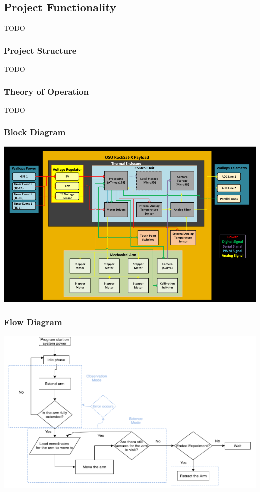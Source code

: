 \subsection{Project Functionality}
TODO

\subsubsection{Project Structure}
TODO

\subsubsection{Theory of Operation}
TODO

\subsubsection{Block Diagram}
\includegraphics[width=\textwidth]{./images/ProjectDocs/functionalBlockDiagram}

\subsubsection{Flow Diagram}
\includegraphics[width=\textwidth]{./images/ProjectDocs/flowDiagram}

